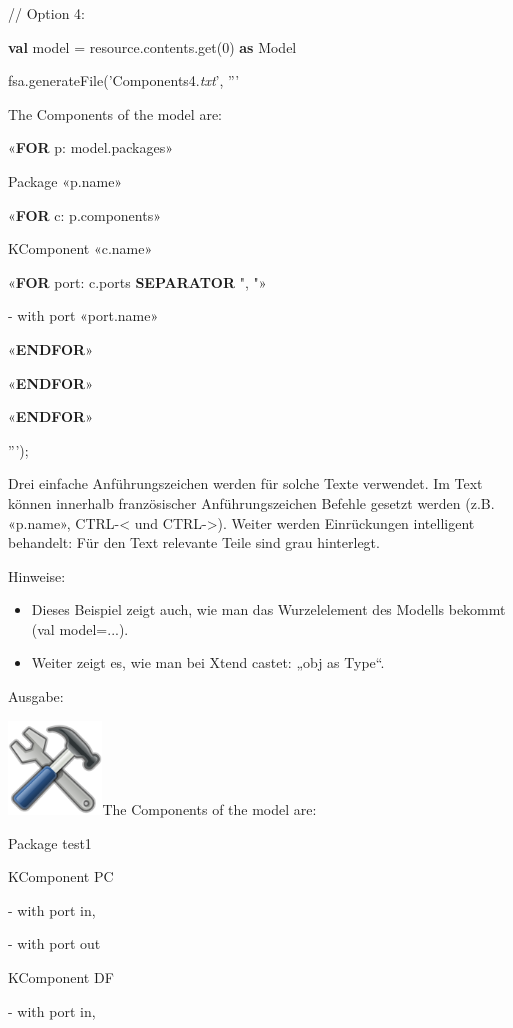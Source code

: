 \documentclass[]{article}
\providecommand{\tightlist}{%
  \setlength{\itemsep}{0pt}\setlength{\parskip}{0pt}}
\begin{document}
// Option 4:

\textbf{val} model = resource.contents.get(0) \textbf{as} Model

fsa.generateFile('Components4.\emph{txt}', '''

The Components of the model are:

«\textbf{FOR} p: model.packages»

Package «p.name»

«\textbf{FOR} c: p.components»

KComponent «c.name»

«\textbf{FOR} port: c.ports \textbf{SEPARATOR} ", "»

- with port «port.name»

«\textbf{ENDFOR}»

«\textbf{ENDFOR}»

«\textbf{ENDFOR}»

''');

Drei einfache Anführungszeichen werden für solche Texte verwendet. Im
Text können innerhalb französischer Anführungszeichen Befehle gesetzt
werden (z.B. «p.name», CTRL-\textless{} und CTRL-\textgreater{}). Weiter
werden Einrückungen intelligent behandelt: Für den Text relevante Teile
sind grau hinterlegt.

Hinweise:

\begin{itemize}
\tightlist
\item
  Dieses Beispiel zeigt auch, wie man das Wurzelelement des Modells
  bekommt (val model=...).
\item
  Weiter zeigt es, wie man bei Xtend castet: „obj as Type``.
\end{itemize}

Ausgabe:

\includegraphics[width=0.98350in,height=0.98350in]{./Pictures/1000020100000080000000807EA91CDFA7B7F397.png}The
Components of the model are:

Package test1

KComponent PC

- with port in,

- with port out

KComponent DF

- with port in,
\end{document}
